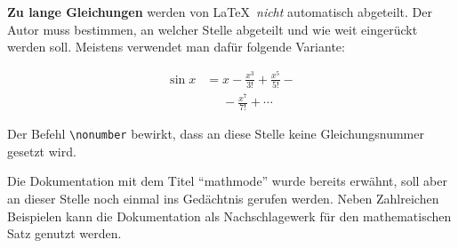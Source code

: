 \textbf{Zu lange Gleichungen} werden von \LaTeX\ \textit{nicht}
automatisch abgeteilt.
Der Autor muss bestimmen, an welcher Stelle abgeteilt und wie
weit eingerückt werden soll.
Meistens verwendet man dafür folgende Variante:

\begin{LTXexample}
\begin{align}
\sin x & =  x -\frac{x^{3}}{3!}
     +\frac{x^{5}}{5!} - {}
                    \nonumber\\
 &\mathrel{\phantom{=}}
  -\frac{x^{7}}{7!} + \cdots
\end{align}
\end{LTXexample}

Der Befehl \lstinline|\nonumber| bewirkt, dass an diese Stelle keine
Gleichungsnummer gesetzt wird.

Die Dokumentation mit dem Titel \enquote{mathmode} wurde bereits erwähnt, soll aber an dieser Stelle
noch einmal ins Gedächtnis gerufen werden. Neben Zahlreichen Beispielen kann
die Dokumentation als Nachschlagewerk für den mathematischen Satz genutzt werden.

\endinput
